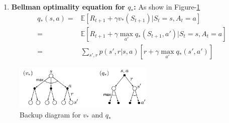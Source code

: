 \begin{enumerate}
    \item \textbf{Bellman optimality equation for $q_*$:} As show in Figure-\ref{fig:backup_diagrams_v_and_q}
    \begin{equation}
    \label{eq:bellman_optimality_equation}
    \begin{split}
        q_*(s,a) = & \mathbb{E}[R_{t+1} + \gamma v_*(S_{t+1})|S_t=s, A_t=a] \\
            = & \mathbb{E}[R_{t+1} + \gamma \max_{a'}q_*(S_{t+1}, a')| S_t=s, A_t=a] \\
            = & \sum_{s',r} p(s',r|s, a)[r+ \gamma \max_{a'}q_*(s', a')]
    \end{split}
    \end{equation}
\end{enumerate}
\begin{figure}[htbp]
    \centering
    \includegraphics[width=0.6\textwidth]{figs/ch_3_6_1_backup_diagrams_v_and_q.png} 
    \caption{Backup diagram for $v_{*}$ and $q_{*}$}
    \label{fig:backup_diagrams_v_and_q}
\end{figure}
